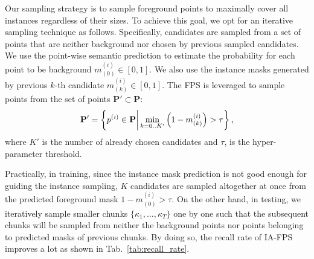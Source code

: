 \documentclass[10pt,twocolumn,letterpaper]{article}
\begin{document}



 Our sampling strategy is to sample foreground points to maximally cover all instances regardless of their sizes. To achieve this goal, we opt for an iterative sampling technique as follows. Specifically, candidates are sampled from a set of points that are neither background nor chosen by previous sampled candidates. 
We use the point-wise semantic prediction to estimate the probability for each point to be background $m^{(i)}_{(0)} \in [0, 1]$. 
We also use the instance masks generated by previous $k$-th candidate $m^{(i)}_{(k)} \in [0, 1]$. 
The FPS is leveraged to sample points from the set of points $\mathbf{P'} \subset \mathbf{P}$: 
\begin{equation}
    \vspace{-4pt}
    \label{eq:sampling}
    \mathbf{P'} = \left \{p^{(i)} \in \mathbf{P} \bigg| \min_{k={0 .. K'}} \left(1 - m^{(i)}_{(k)} \right) > \tau\right \},
\end{equation}
where $K'$ is the number of already chosen candidates and $\tau$, is the hyper-parameter threshold. 

Practically, in training, since the instance mask prediction is not good enough for guiding the instance sampling, $K$ candidates are sampled altogether at once from the predicted foreground mask $1 -m^{(i)}_{(0)} > \tau$.
On the other hand, in testing, we iteratively sample smaller chunks $\{ \kappa_{1},\ldots, \kappa_{T}\}$ one by one such that the subsequent chunks will be sampled from neither the background points nor points belonging to predicted masks of previous chunks. By doing so, the recall rate of IA-FPS improves a lot as shown in Tab.~\ref{tab:recall_rate}.
\end{document}
